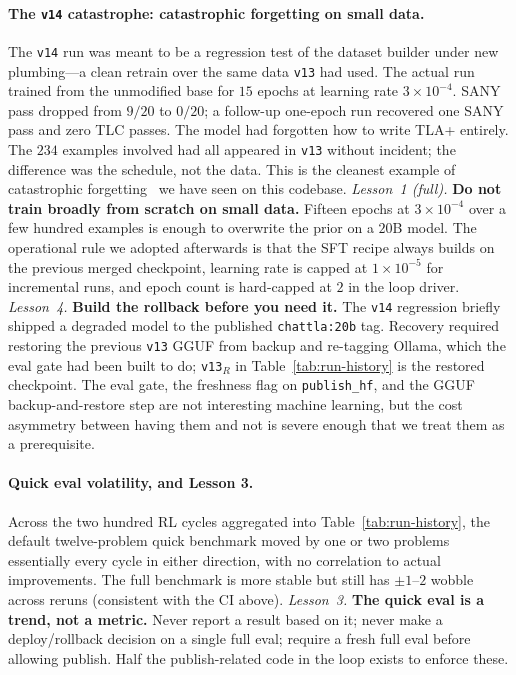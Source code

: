 \documentclass[11pt]{article}
\begin{document}
\paragraph{The \texttt{v14} catastrophe: catastrophic forgetting on
small data.} The \texttt{v14} run was meant to be a regression test of
the dataset builder under new plumbing---a clean retrain over the same
data \texttt{v13} had used. The actual run trained from the unmodified
base for $15$ epochs at learning rate $3\!\times\!10^{-4}$. SANY pass
dropped from $9/20$ to $0/20$; a follow-up one-epoch run recovered one
SANY pass and zero TLC passes. The model had forgotten how to write
TLA+ entirely. The $234$ examples involved had all appeared in
\texttt{v13} without incident; the difference was the schedule, not
the data. This is the cleanest example of catastrophic
forgetting~\cite{kirkpatrick2017ewc, lopez2017gem} we have seen on
this codebase. \emph{Lesson~1 (full).} \textbf{Do not train broadly
from scratch on small data.} Fifteen epochs at $3\!\times\!10^{-4}$
over a few hundred examples is enough to overwrite the prior on a
$20$B model. The operational rule we adopted afterwards is that the
SFT recipe always builds on the previous merged checkpoint, learning
rate is capped at $1\!\times\!10^{-5}$ for incremental runs, and epoch
count is hard-capped at $2$ in the loop driver. \emph{Lesson~4.}
\textbf{Build the rollback before you need it.} The \texttt{v14}
regression briefly shipped a degraded model to the published
\texttt{chattla:20b} tag. Recovery required restoring the previous
\texttt{v13} GGUF from backup and re-tagging Ollama, which the eval
gate had been built to do; \texttt{v13}$_R$ in
Table~\ref{tab:run-history} is the restored checkpoint. The eval gate,
the freshness flag on \texttt{publish\_hf}, and the GGUF
backup-and-restore step are not interesting machine learning, but the
cost asymmetry between having them and not is severe enough that we
treat them as a prerequisite.

\paragraph{Quick eval volatility, and Lesson 3.} Across the two hundred
RL cycles aggregated into Table~\ref{tab:run-history}, the default
twelve-problem quick benchmark moved by one or two problems essentially
every cycle in either direction, with no correlation to actual
improvements. The full benchmark is more stable but still has
$\pm 1$--$2$ wobble across reruns (consistent with the CI above).
\emph{Lesson~3.} \textbf{The quick eval is a trend, not a metric.}
Never report a result based on it; never make a deploy/rollback
decision on a single full eval; require a fresh full eval before
allowing publish. Half the publish-related code in the loop exists to
enforce these.
\end{document}
